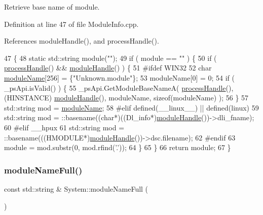 Retrieve base name of module. 

Definition at line 47 of file Module\+Info.\+cpp.



References module\+Handle(), and process\+Handle().


\begin{DoxyCode}
47                                       \{
48   \textcolor{keyword}{static} std::string module(\textcolor{stringliteral}{""});
49   \textcolor{keywordflow}{if} ( module == \textcolor{stringliteral}{""} )   \{
50     \textcolor{keywordflow}{if} ( \hyperlink{namespaceSystem_a563f947d4a2921f4348ff4f8e909a9f2}{processHandle}() && \hyperlink{namespaceSystem_ab88d0de1d6850b6f95522e9c242eeab0}{moduleHandle}() )    \{
51 \textcolor{preprocessor}{#ifdef WIN32}
52       \textcolor{keywordtype}{char} \hyperlink{namespaceSystem_add155d288552032434ee9e25d130ad72}{moduleName}[256] = \{\textcolor{stringliteral}{"Unknown.module"}\};
53       moduleName[0] = 0;
54       \textcolor{keywordflow}{if} ( \_psApi.isValid() )   \{
55         \_psApi.GetModuleBaseNameA( \hyperlink{namespaceSystem_a563f947d4a2921f4348ff4f8e909a9f2}{processHandle}(), (HINSTANCE)
      \hyperlink{namespaceSystem_ab88d0de1d6850b6f95522e9c242eeab0}{moduleHandle}(), moduleName, \textcolor{keyword}{sizeof}(moduleName) );
56       \}
57       std::string mod = \hyperlink{namespaceSystem_add155d288552032434ee9e25d130ad72}{moduleName};
58 \textcolor{preprocessor}{#elif defined(\_\_linux\_\_) || defined(linux)}
59       std::string mod = ::basename((\textcolor{keywordtype}{char}*)((Dl\_info*)\hyperlink{namespaceSystem_ab88d0de1d6850b6f95522e9c242eeab0}{moduleHandle}())->dli\_fname);
60 \textcolor{preprocessor}{#elif \_\_hpux}
61       std::string mod = ::basename(((HMODULE*)\hyperlink{namespaceSystem_ab88d0de1d6850b6f95522e9c242eeab0}{moduleHandle}())->dsc.filename);
62 \textcolor{preprocessor}{#endif}
63       module = mod.substr(0, mod.rfind(\textcolor{charliteral}{'.'}));
64     \}
65   \}
66   \textcolor{keywordflow}{return} module;
67 \} 
\end{DoxyCode}
\mbox{\label{namespaceSystem_abbb9e2ab2f883bfe24805d89bef43792}} 
\subsubsection{\texorpdfstring{module\+Name\+Full()}{moduleNameFull()}}
{\footnotesize\ttfamily const std\+::string \& System\+::module\+Name\+Full (\begin{DoxyParamCaption}{ }\end{DoxyParamCaption})}



